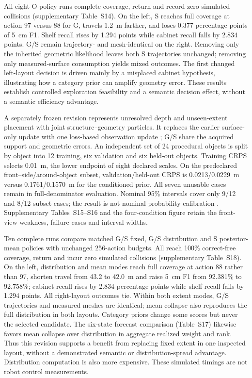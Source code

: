 All eight O-policy runs complete coverage, return and record zero simulated collisions (supplementary Table~S14). On the left, S reaches full coverage at action 97 versus 88 for G, travels 1.2~m farther, and loses 0.377 percentage points of 5~cm F1. Shelf recall rises by 1.294 points while cabinet recall falls by 2.834 points. G/S remain trajectory- and mesh-identical on the right. Removing only the inherited geometric likelihood leaves both S trajectories unchanged; removing only measured-surface consumption yields mixed outcomes. The first changed left-layout decision is driven mainly by a misplaced cabinet hypothesis, illustrating how a category prior can amplify geometry error. These results establish controlled exploration feasibility and a semantic decision effect, without a semantic efficiency advantage.

A separately frozen revision represents unresolved depth and unseen-extent placement with joint structure--geometry particles. It replaces the earlier surface-only update with one loss-based observation update \cite{bissiri2016}; G/S share the acquired support and geometric errors. An independent set of 24 procedural objects is split by object into 12 training, six validation and six held-out objects. Training CRPS selects 0.01~m, the lower endpoint of eight declared scales. On the predeclared front--side/around-object subset, validation/held-out CRPS is 0.0213/0.0229~m versus 0.1761/0.1570~m for the conditioned prior. All seven unusable cases remain in full-denominator evaluation. Nominal 95\% intervals cover only 9/12 and 8/12 subset cases; the result is not nominal probability calibration \cite{syring2019}. Supplementary Tables~S15--S16 and the four-condition figure retain the front-view weakness, failure cases and interval widths.

Ten complete runs compare matched G/S fixed, G/S distribution and S posterior-mean policies with unchanged 256-action budgets. All reach 100\% correct-free coverage, return and incur zero simulated collisions (supplementary Table~S18). On the left, distribution and mean modes reach full coverage at action 88 rather than 97, shorten travel from 43.2 to 42.0~m and raise 5~cm F1 from 92.381\% to 92.758\%; cabinet recall rises by 2.834 percentage points while shelf recall falls by 1.294 points. All right-layout outcomes tie. Within both extent modes, G/S trajectories and measured meshes are identical; mean collapse also reproduces the full distribution in both layouts. Category priors change some scores but never the selected candidate. The six-state forecast comparison (Table~S17) likewise favors mean collapse over distribution in aggregate realized weight and rank. Thus this revision supports a benefit from replacing fixed extent in one inspected layout, without a demonstrated semantic or distribution-spread advantage. Distribution computation is also more expensive. These simulated timings are not robot control measurements.

